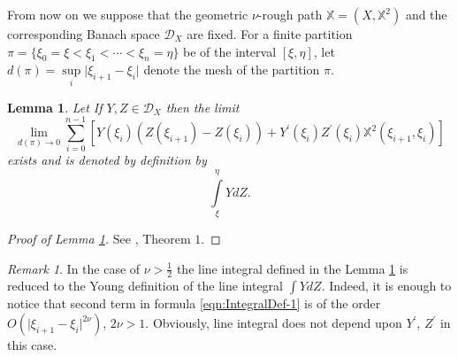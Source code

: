 \documentclass[11pt,a4paper,leqno]{amsart}%
\theoremstyle{plain}
\theoremstyle{remark}
\newtheorem{remark}[theorem]{Remark}
\theoremstyle{plain}
\newtheorem{lemma}[theorem]{Lemma}
\numberwithin{equation}{section}
\def\liml{\lim\limits}
\def\supl{\sup\limits}
\def\intl{\int\limits}
\def\supl{\mathop{\sup}\limits}
\begin{document}
From now on we suppose that the geometric $\nu$-rough path
$\mathbb{X}=(X,\mathbb{X}^2)$ and the corresponding Banach space
$\mathcal{D}_X$ are fixed.  For a  finite
partition $\pi=\{\xi_0=\xi<\xi_1<\cdots<\xi_n=\eta\}$ be   of the interval  $[\xi,\eta]$, let  $d(\pi)=\supl_i\vert \xi_{i+1}-\xi_i\vert $ denote the mesh of the partition $\pi$.
\begin{lemma}\label{lem:IntegralDef}
Let  If $Y,Z\in \mathcal{D}_X$ then the limit
\begin{equation}
\liml_{d(\pi)\to
0}\sum_{i=0}^{n-1}[Y(\xi_i)(Z(\xi_{i+1})-Z(\xi_i))+Y^\prime(\xi_i)Z^\prime(\xi_i)\mathbb{X}^2(\xi_{i+1},\xi_i)]\label{eqn:IntegralDef-1}
\end{equation}
exists and is denoted by definition by
$$
\intl_{\xi}^{\eta}YdZ.
$$
\end{lemma}
\begin{proof}[ Proof of Lemma \ref{lem:IntegralDef}]
See \cite{[Gubinelli-2004]}, Theorem $1$.
\end{proof}
\begin{remark}\label{rem:SmoothCase}
In the case of $\nu>\frac{1}{2}$ the line integral defined in the
Lemma \ref{lem:IntegralDef} is reduced to the Young definition of the
line integral $\int YdZ$. Indeed, it is enough to notice that
second term in formula \eqref{eqn:IntegralDef-1} is of the order
$O(\vert \xi_{i+1}-\xi_i\vert^{2\nu})$, $2\nu>1$. Obviously, line integral
does not depend upon $Y^\prime$, $Z^\prime$ in this case.
\end{remark}
\end{document}
